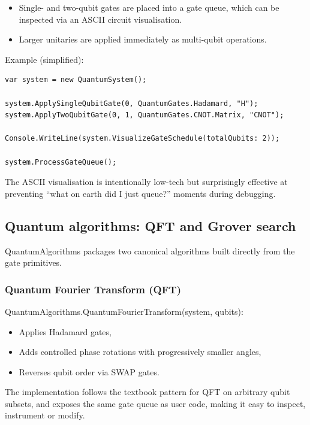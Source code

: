 \documentclass[a4paper,11pt]{article}
\begin{document}
\begin{itemize}
\item
  Single- and two-qubit gates are placed into a gate queue, which can be inspected via an ASCII circuit visualisation.
\item
  Larger unitaries are applied immediately as multi-qubit operations.
\end{itemize}

Example (simplified):

\begin{lstlisting}[style=codeblock]
var system = new QuantumSystem();

system.ApplySingleQubitGate(0, QuantumGates.Hadamard, "H");
system.ApplyTwoQubitGate(0, 1, QuantumGates.CNOT.Matrix, "CNOT");

Console.WriteLine(system.VisualizeGateSchedule(totalQubits: 2));

system.ProcessGateQueue();
\end{lstlisting}

The ASCII visualisation is intentionally low-tech but surprisingly effective at preventing ``what on earth did I just queue?'' moments during debugging.

\subsection{Quantum algorithms: QFT and Grover search}

QuantumAlgorithms packages two canonical algorithms built directly from the gate primitives.

\subsubsection{Quantum Fourier Transform (QFT)}

QuantumAlgorithms.QuantumFourierTransform(system, qubits):

\begin{itemize}
\item
  Applies Hadamard gates,
\item
  Adds controlled phase rotations with progressively smaller angles,
\item
  Reverses qubit order via SWAP gates.
\end{itemize}

The implementation follows the textbook pattern for QFT on arbitrary qubit subsets, and exposes the same gate queue as user code, making it easy to inspect, instrument or modify.
\end{document}
